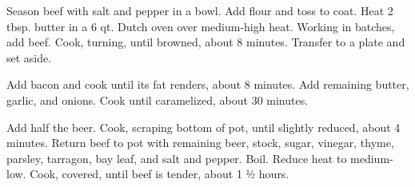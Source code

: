 \documentclass{cookbook}
\begin{document}


Season beef with salt and pepper in a bowl. Add flour and toss to coat. Heat 2 tbsp. butter in a 6 qt. Dutch oven over medium-high heat. Working in batches, add beef. Cook, turning, until browned, about 8 minutes. Transfer to a plate and set aside.

Add bacon and cook until its fat renders, about 8 minutes. Add remaining butter, garlic, and onions. Cook until caramelized, about 30 minutes.

Add half the beer. Cook, scraping bottom of pot, until slightly reduced, about 4 minutes. Return beef to pot with remaining beer, stock, sugar, vinegar, thyme, parsley, tarragon, bay leaf, and salt and pepper. Boil. Reduce heat to medium-low. Cook, covered, until beef is tender, about 1 ½ hours.


\end{document}
